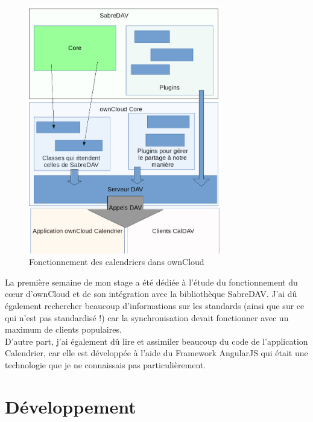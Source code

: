 \documentclass[10pt,a4paper, twoside]{report}
\begin{document}
	\begin{figure}[h]
		\centering
		\includegraphics[width=0.75\textwidth]{images/schema.png}
		\caption{Fonctionnement des calendriers dans ownCloud}
		\label{normal_case}
	\end{figure}
	
	La première semaine de mon stage a été dédiée à l'étude du fonctionnement du cœur d'ownCloud et de son intégration avec la bibliothèque SabreDAV. J'ai dû également rechercher beaucoup d'informations sur les standards (ainsi que sur ce qui n'est pas standardisé !) car la synchronisation devait fonctionner avec un maximum de clients populaires.
	\\
	
	D'autre part, j'ai également dû lire et assimiler beaucoup du code de l'application Calendrier, car elle est développée à l'aide du Framework AngularJS qui était une technologie que je ne connaissais pas particulièrement.
	\chapter{Développement}
\end{document}
